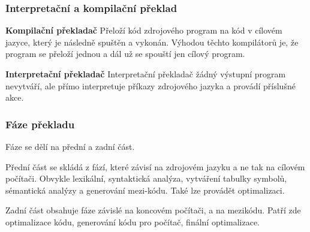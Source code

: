 \subsubsection{Interpretační a kompilační překlad }
\textbf{Kompilační překladač} Přeloží kód zdrojového program na kód v cílovém jazyce, který je následně spuštěn a vykonán. Výhodou těchto kompilátorů je, že program se přeloží jednou a dál už se spouští jen cílový program. 

\textbf{Interpretační překladač} Interpretační překladač žádný výstupní program nevytváří, ale přímo interpretuje příkazy zdrojového jazyka a provádí příslušné akce.

\subsubsection{Fáze překladu}
Fáze se dělí na přední a zadní část. 

Přední část se skládá z fází, které závisí na zdrojovém jazyku a ne tak na cílovém počítači. Obvykle lexikální, syntaktická analýza, vytváření tabulky symbolů, sémantická analýzy a generování mezi-kódu. Také lze provádět optimalizaci.

Zadní část obsahuje fáze závislé na koncovém počítači, a na mezikódu. Patří zde optimalizace kódu, generování kódu pro počítač, finální optimalizace.